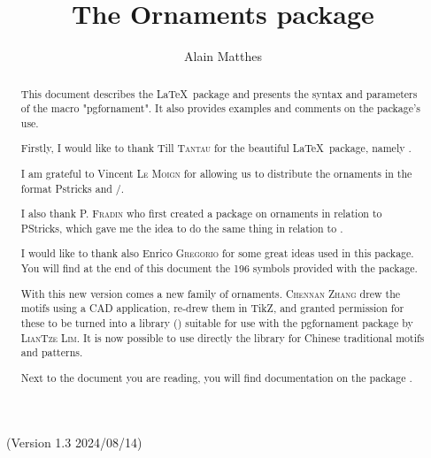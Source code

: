 \documentclass[a4paper,nofonts]{tufte-handout}
\title{The Ornaments package}
\author{Alain Matthes}
\begin{document}
\maketitle
\noindent{}
\begin{marginfigure}
\end{marginfigure}


\bigskip
\noindent{}\ (Version  1.3 2024/08/14)
\begin{abstract}

This document describes the \LaTeX\ package \emph{} and presents the syntax and parameters of the macro "pgfornament".
It also provides examples and comments on the package's use.

 Firstly, I would like to thank {Till \textsc{Tantau}} for the  beautiful \LaTeX\ package, namely \TIKZ.

I am grateful to  Vincent \textsc{Le Moign} for allowing us to distribute the ornaments  in the format Pstricks and \PGF/\TIKZ.

I also thank \textsc{P. Fradin} who first created a package on ornaments in relation to PStricks, which gave me the idea to do the same thing in relation to \TIKZ.

I would like to thank also {Enrico  \textsc{Gregorio}} for some great ideas used in this package. You will find at the end of this document the 196 symbols provided with the package.

With this new version comes a new family of ornaments.
\textsc{Chennan Zhang} drew the motifs using a CAD application, re-drew them in TikZ, and granted permission for these to be turned into a library (\emph{}) suitable for use with the pgfornament package by \textsc{LianTze Lim}.
It is now possible to use directly the library for Chinese traditional motifs and patterns.

Next to the document you are reading, you will find documentation on the package \emph{}.
\end{abstract}

\vspace{1cm}
\hfil  {}\hfil
\end{document}
